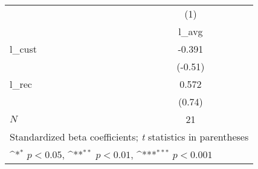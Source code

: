 {
\def\sym#1{\ifmmode^{#1}\else\(^{#1}\)\fi}
\begin{tabular}{l*{1}{c}}
\hline\hline
            &\multicolumn{1}{c}{(1)}\\
            &\multicolumn{1}{c}{l\_avg}\\
\hline
l\_cust      &      -0.391         \\
            &     (-0.51)         \\
[1em]
l\_rec       &       0.572         \\
            &      (0.74)         \\
\hline
\(N\)       &          21         \\
\hline\hline
\multicolumn{2}{l}{\footnotesize Standardized beta coefficients; \textit{t} statistics in parentheses}\\
\multicolumn{2}{l}{\footnotesize \sym{*} \(p<0.05\), \sym{**} \(p<0.01\), \sym{***} \(p<0.001\)}\\
\end{tabular}
}
